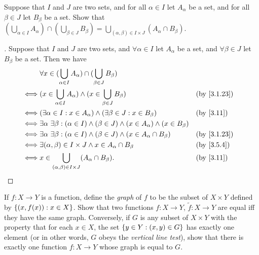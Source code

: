 \begin{ex}\label{ex:3.5.9}
	Suppose that \(I\) and \(J\) are two sets, and for all \(\alpha \in I\) let \(A_{\alpha}\) be a set, and for all \(\beta \in J\) let \(B_{\beta}\) be a set.
	Show that \((\bigcup_{\alpha \in I} A_{\alpha}) \cap (\bigcup_{\beta \in J} B_{\beta}) = \bigcup_{(\alpha, \beta) \in I \times J} (A_{\alpha} \cap B_{\beta})\).
\end{ex}

\begin{proof}[]
	Suppose that \(I\) and \(J\) are two sets, and \(\forall \alpha \in I\) let \(A_{\alpha}\) be a set, and \(\forall \beta \in J\) let \(B_{\beta}\) be a set.
	Then we have
	\begin{align*}
		     & \forall x \in (\bigcup_{\alpha \in I} A_{\alpha}) \cap (\bigcup_{\beta \in J} B_{\beta})                                              \\
		\iff & (x \in \bigcup_{\alpha \in I} A_{\alpha}) \land (x \in \bigcup_{\beta \in J} B_{\beta})                              &  & \by{3.1.23} \\
		\iff & (\exists \alpha \in I : x \in A_{\alpha}) \land (\exists \beta \in J : x \in B_{\beta})                              &  & \by{3.11}   \\
		\iff & \exists \alpha \ \exists \beta : (\alpha \in I) \land (\beta \in J) \land (x \in A_{\alpha}) \land (x \in B_{\beta})                  \\
		\iff & \exists \alpha \ \exists \beta : (\alpha \in I) \land (\beta \in J) \land (x \in A_{\alpha} \cap B_{\beta})          &  & \by{3.1.23} \\
		\iff & \exists (\alpha, \beta) \in I \times J \land x \in A_{\alpha} \cap B_{\beta}                                         &  & \by{3.5.4}  \\
		\iff & x \in \bigcup_{(\alpha, \beta) \in I \times J} (A_{\alpha} \cap B_{\beta}).                                          &  & \by{3.11}
	\end{align*}
\end{proof}

\begin{ex}\label{ex:3.5.10}
	If \(f : X \to Y\) is a function, define the \emph{graph} of \(f\) to be the subset of \(X \times Y\) defined by \(\left\lbrace(x, f(x)) : x \in X\right\rbrace\).
	Show that two functions \(f : X \to Y\), \(\tilde{f} : X \to Y\) are equal iff they have the same graph.
	Conversely, if \(G\) is any subset of \(X \times Y\) with the property that for each \(x \in X\), the set \(\left\lbrace y \in Y : (x, y) \in G\right\rbrace\) has exactly one element (or in other words, \(G\) obeys the \emph{vertical line test}), show that there is exactly one function \(f : X \to Y\) whose graph is equal to \(G\).
\end{ex}

